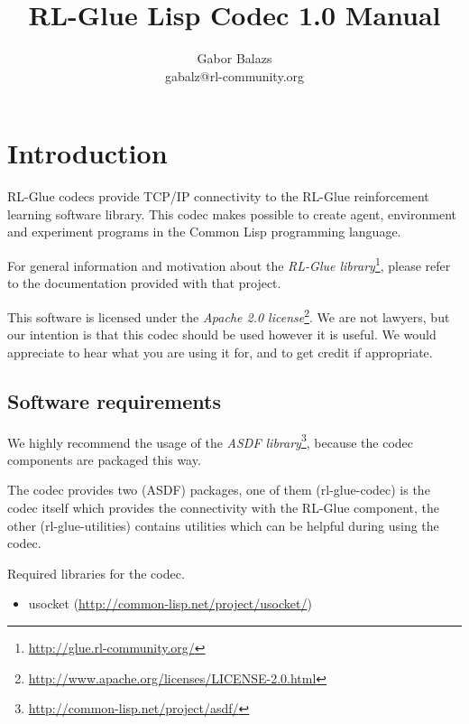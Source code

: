 \documentclass[11pt,a4paper,dvipdfm]{article}
\newcommand{\selfref}[1]{\href{#1}{#1}}
\newcommand{\footref}[2]{\textsl{#1}\footnote{\selfref{#2}}}
\begin{document}
\title{RL-Glue Lisp Codec 1.0 Manual}
\author{Gabor Balazs \\ gabalz@rl-community.org}
\date{}

\maketitle
\setcounter{tocdepth}{2}
\tableofcontents
\newpage


\section{Introduction}

RL-Glue codecs provide TCP/IP connectivity to the RL-Glue reinforcement
learning software library. This codec makes possible to create agent,
environment and experiment programs in the Common Lisp programming language.

For general information and motivation about the
\footref{RL-Glue library}{http://glue.rl-community.org/}, please refer to the
documentation provided with that project.

This software is licensed under the
\footref{Apache 2.0 license}{http://www.apache.org/licenses/LICENSE-2.0.html}.
We are not lawyers, but our intention is that this codec should be used however
it is useful. We would appreciate to hear what you are using it for, and to get
credit if appropriate.

\hypertarget{softreqs}{\subsection{Software requirements}}

We highly recommend the usage of the
\footref{ASDF library}{http://common-lisp.net/project/asdf/},
because the codec components are packaged this way.

The codec provides two (ASDF) packages, one of them (rl-glue-codec) is
the codec itself which provides the connectivity with the RL-Glue component,
the other (rl-glue-utilities) contains utilities which can be helpful during
using the codec.

Required libraries for the codec.
\begin{itemize}
\item[] usocket (\selfref{http://common-lisp.net/project/usocket/})
\end{itemize}
\end{document}
